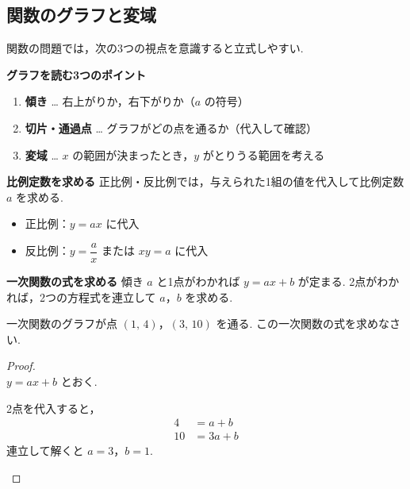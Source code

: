 \subsection{関数のグラフと変域}

関数の問題では，次の3つの視点を意識すると立式しやすい.

\begin{techniquebox}[tech:01]{\textbf{グラフを読む3つのポイント}}
    \begin{enumerate}
        \item \textbf{傾き} … 右上がりか，右下がりか（$a$ の符号）
        \item \textbf{切片・通過点} … グラフがどの点を通るか（代入して確認）
        \item \textbf{変域} … $x$ の範囲が決まったとき，$y$ がとりうる範囲を考える
    \end{enumerate}
\end{techniquebox}

\begin{techniquebox}[tech:02]{\textbf{比例定数を求める}}
    正比例・反比例では，与えられた1組の値を代入して比例定数 $a$ を求める.
    \begin{itemize}
        \item 正比例：$y = ax$ に代入
        \item 反比例：$y = \dfrac{a}{x}$ または $xy = a$ に代入
    \end{itemize}
\end{techniquebox}

\begin{techniquebox}[tech:03]{\textbf{一次関数の式を求める}}
    傾き $a$ と1点がわかれば $y = ax + b$ が定まる.
    2点がわかれば，2つの方程式を連立して $a$，$b$ を求める.
\end{techniquebox}

\begin{example}[【例題 1】]
    一次関数のグラフが点 $(1,\,4)$，$(3,\,10)$ を通る. この一次関数の式を求めなさい.
\end{example}

\begin{proof}\mbox{}\\
    $y = ax + b$ とおく.

    \begin{hiddenanswer}
        2点を代入すると，
        \begin{align*}
            4 &= a + b \\
            10 &= 3a + b
        \end{align*}
        連立して解くと $a = 3$，$b = 1$.
    \end{hiddenanswer}
\end{proof}

\newpage
